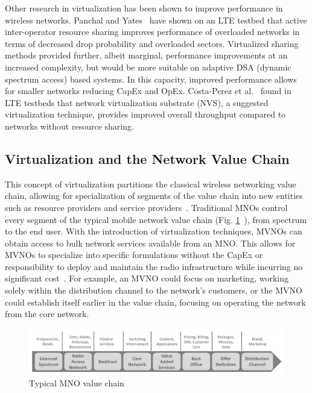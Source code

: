 \documentclass[12pt,dvipsnames]{report}
\begin{document}
Other research in virtualization has been shown to improve performance in wireless networks.  Panchal and Yates~\cite{6571315} have shown on an LTE testbed that active inter-operator resource sharing improves performance of overloaded networks in terms of decreased drop probability and overloaded sectors.  Virtualized sharing methods provided further, albeit marginal, performance improvements at an increased complexity, but would be more suitable on adaptive DSA (dynamic spectrum access) based systems.  In this capacity, improved performance allows for smaller networks reducing CapEx and OpEx.  Costa-Perez et al.~\cite{6553675} found in LTE testbeds that network virtualization substrate (NVS), a suggested virtualization technique, provides improved overall throughput compared to networks without resource sharing.

\subsection{Virtualization and the Network Value Chain} \label{subsec:virtualization_valuechain}

This concept of virtualization partitions the classical wireless networking value chain, allowing for specialization of segments of the value chain into new entities such as resource providers and service providers~\cite{1421931}.  Traditional MNOs control every segment of the typical mobile network value chain (Fig. \ref{fig:ClassicNetworkValueChain}~\cite{6737248}), from spectrum to the end user.  With the introduction of virtualization techniques, MVNOs can obtain access to bulk network services available from an MNO.  This allows for MVNOs to specialize into specific formulations without the CapEx or responsibility to deploy and maintain the radio infrastructure while incurring no significant cost~\cite{6737248}.  For example, an MVNO could focus on marketing, working solely within the distribution channel to the network's customers, or the MVNO could establish itself earlier in the value chain, focusing on operating the network from the core network.

\begin{figure}
	\centering
	\includegraphics[width=\linewidth]{ClassicNetworkValueChain}
	\caption[Typical MNO value chain]{\small Typical MNO value chain~\cite{6737248}}
	\label{fig:ClassicNetworkValueChain}
\end{figure}
\end{document}
